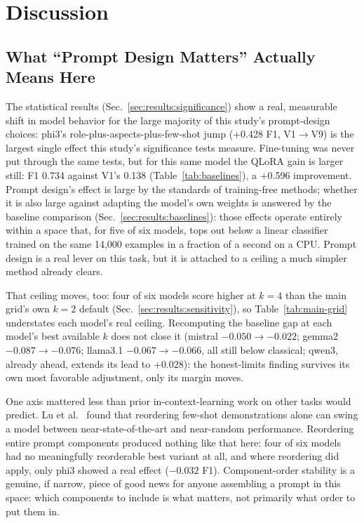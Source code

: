 \section{Discussion}
\label{sec:discussion}

\subsection{What ``Prompt Design Matters'' Actually Means Here}
\label{sec:discussion:prompt-effects}

The statistical results (Sec.~\ref{sec:results:significance}) show a
real, measurable shift in model behavior for the large majority of this
study's prompt-design choices: phi3's role-plus-aspects-plus-few-shot
jump (+0.428 F1, V1$\to$V9) is the largest single effect this study's
significance tests measure. Fine-tuning was never put through the same
tests, but for this same model the QLoRA gain is larger still: F1 0.734
against V1's 0.138 (Table~\ref{tab:baselines}), a +0.596 improvement.
Prompt design's effect is large by the standards of training-free
methods; whether it is also large against adapting the model's own
weights is answered by the baseline comparison
(Sec.~\ref{sec:results:baselines}): those effects operate entirely
within a space that, for five of six models, tops out below a linear
classifier trained on the same 14{,}000 examples in a fraction of a
second on a CPU. Prompt design is a real lever on this task, but it is
attached to a ceiling a much simpler method already clears.

That ceiling moves, too: four of six models score higher at $k=4$ than
the main grid's own $k=2$ default (Sec.~\ref{sec:results:sensitivity}),
so Table~\ref{tab:main-grid} understates each model's real ceiling.
Recomputing the baseline gap at each model's best available $k$ does not
close it (mistral $-0.050\to-0.022$; gemma2 $-0.087\to-0.076$; llama3.1
$-0.067\to-0.066$, all still below classical; qwen3, already ahead,
extends its lead to $+0.028$): the honest-limits finding survives its
own most favorable adjustment, only its margin moves.

One axis mattered less than prior in-context-learning work on other
tasks would predict. Lu et al.~\cite{lu2022fantastically} found that
reordering few-shot demonstrations alone can swing a model between
near-state-of-the-art and near-random performance. Reordering entire
prompt components produced nothing like that here: four of six models had
no meaningfully reorderable best variant at all, and where reordering did
apply, only phi3 showed a real effect ($-0.032$ F1). Component-order
stability is a genuine, if narrow, piece of good news for anyone
assembling a prompt in this space: which components to include is what
matters, not primarily what order to put them in.

